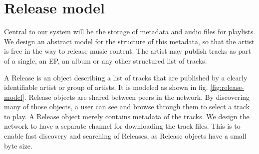 \section{Release model}
\label{sec:release-model}
Central to our system will be the storage of metadata and audio files for playlists. We design an abstract model for the structure of this metadata, so that the artist is free in the way to release music content. The artist may publish tracks as part of a single, an EP, an album or any other structured list of tracks.

A Release is an object describing a list of tracks that are published by a clearly identifiable artist or group of artists. It is modeled as shown in fig. \ref{fig:release-model}. Release objects are shared between peers in the network. By discovering many of those objects, a user can see and browse through them to select a track to play. A Release object merely contains metadata of the tracks. We design the network to have a separate channel for downloading the track files. This is to enable fast discovery and
searching of Releases, as Release objects have a small byte size. 
